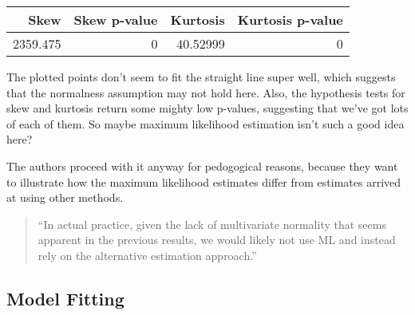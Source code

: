 \documentclass[
  letterpaper,
  DIV=11,
  numbers=noendperiod]{scrreprt}
\newenvironment{Shaded}{\begin{snugshade}}{\end{snugshade}}
\newcommand{\CommentTok}[1]{\textcolor[rgb]{0.37,0.37,0.37}{#1}}
\newcommand{\FunctionTok}[1]{\textcolor[rgb]{0.28,0.35,0.67}{#1}}
\newcommand{\NormalTok}[1]{\textcolor[rgb]{0.00,0.23,0.31}{#1}}
\newcommand{\OtherTok}[1]{\textcolor[rgb]{0.00,0.23,0.31}{#1}}
\newcommand{\SpecialCharTok}[1]{\textcolor[rgb]{0.37,0.37,0.37}{#1}}
\newcommand{\StringTok}[1]{\textcolor[rgb]{0.13,0.47,0.30}{#1}}
\begin{document}
\begin{Shaded}
\end{Shaded}

\begin{longtable}[]{@{}rrrr@{}}
\toprule()
Skew & Skew p-value & Kurtosis & Kurtosis p-value \\
\midrule()
\endhead
2359.475 & 0 & 40.52999 & 0 \\
\bottomrule()
\end{longtable}

The plotted points don't seem to fit the straight line super well, which
suggests that the normalness assumption may not hold here. Also, the
hypothesis tests for skew and kurtosis return some mighty low p-values,
suggesting that we've got lots of each of them. So maybe maximum
likelihood estimation isn't such a good idea here?

The authors proceed with it anyway for pedogogical reasons, because they
want to illustrate how the maximum likelihood estimates differ from
estimates arrived at using other methods.

\begin{quote}
``In actual practice, given the lack of multivariate normality that
seems apparent in the previous results, we would likely not use ML and
instead rely on the alternative estimation approach.''
\end{quote}

\hypertarget{model-fitting}{%
\subsection*{Model Fitting}\label{model-fitting}}
\end{document}
